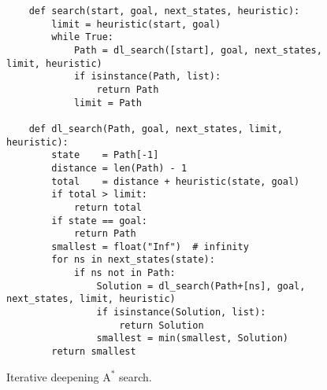 \begin{figure}[!ht]
\centering
\begin{verbatim}
    def search(start, goal, next_states, heuristic):
        limit = heuristic(start, goal)
        while True:
            Path = dl_search([start], goal, next_states, limit, heuristic)
            if isinstance(Path, list):
                return Path
            limit = Path
    
    def dl_search(Path, goal, next_states, limit, heuristic):
        state    = Path[-1]
        distance = len(Path) - 1
        total    = distance + heuristic(state, goal)
        if total > limit:
            return total
        if state == goal:
            return Path
        smallest = float("Inf")  # infinity
        for ns in next_states(state):
            if ns not in Path:
                Solution = dl_search(Path+[ns], goal, next_states, limit, heuristic)
                if isinstance(Solution, list):
                    return Solution
                smallest = min(smallest, Solution)
        return smallest
\end{verbatim}
\vspace*{-0.3cm}
\caption{Iterative deepening $\textrm{A}^*$ search.}
\label{fig:iterative-deepening-a-star.stlx}
\end{figure}
